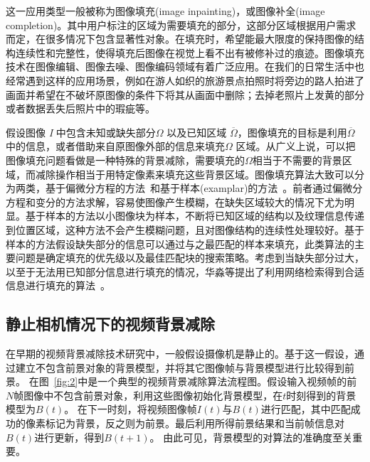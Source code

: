 这一应用类型一般被称为图像填充(image inpainting)，或图像补全(image completion)。其中用户标注的区域为需要填充的部分，这部分区域根据用户需求而定，在很多情况下包含显著性对象。在填充时，希望能最大限度的保持图像的结构连续性和完整性，使得填充后图像在视觉上看不出有被修补过的痕迹。图像填充技术在图像编辑、图像去噪、图像编码领域有着广泛应用。在我们的日常生活中也经常遇到这样的应用场景，例如在游人如织的旅游景点拍照时将旁边的路人拍进了画面并希望在不破坏原图像的条件下将其从画面中删除；去掉老照片上发黄的部分或者数据丢失后照片中的瑕疵等。\par
假设图像 \emph{I} 中包含未知或缺失部分\(\Omega\) 以及已知区域 \(\overline{\Omega}\)，图像填充的目标是利用\(\overline{\Omega}\)中的信息，或者借助来自原图像外部的信息来填充\(\Omega\) 区域。从广义上说，可以把图像填充问题看做是一种特殊的背景减除，需要填充的\(\Omega\)相当于不需要的背景区域，而减除操作相当于用特定像素来填充这些背景区域。图像填充算法大致可以分为两类，基于偏微分方程的方法~\cite{Bertalmio:2000}和基于样本(examplar)的方法~\cite{Criminisi04regionfilling}。前者通过偏微分方程和变分的方法求解，容易使图像产生模糊，在缺失区域较大的情况下尤为明显。基于样本的方法以小图像块为样本，不断将已知区域的结构以及纹理信息传递到位置区域，这种方法不会产生模糊问题，且对图像结构的连续性处理较好。基于样本的方法假设缺失部分的信息可以通过与之最匹配的样本来填充，此类算法的主要问题是确定填充的优先级以及最佳匹配块的搜索策略。考虑到当缺失部分过大，以至于无法用已知部分信息进行填充的情况，华淼等提出了利用网络检索得到合适信息进行填充的算法~\cite{huamiao}。


\subsection{静止相机情况下的视频背景减除}
\label{sec:staticCamera}
在早期的视频背景减除技术研究中，一般假设摄像机是静止的。基于这一假设，通过建立不包含前景对象的背景模型，并将其它图像帧与背景模型进行比较得到前景。
在图~\ref{fig:2}中是一个典型的视频背景减除算法流程图。假设输入视频帧的前$N$帧图像中不包含前景对象，利用这些图像初始化背景模型，在$t$时刻得到的背景模型为$B(t)$。
在下一时刻，将视频图像帧$I(t)$与$B(t)$进行匹配，其中匹配成功的像素标记为背景，反之则为前景。最后利用所得前景结果和当前帧信息对$B(t)$进行更新，得到$B(t+1)$。
由此可见，背景模型的对算法的准确度至关重要。

